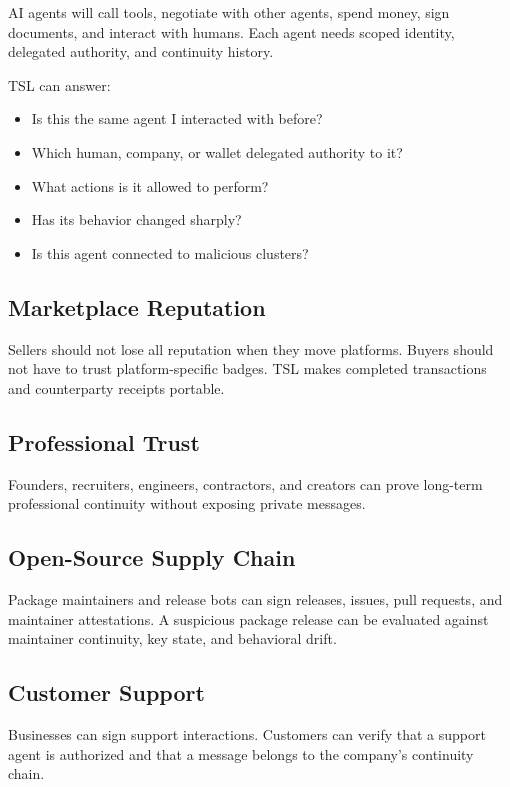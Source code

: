 \documentclass[11pt]{article}
\newcommand{\TSL}{\textsc{TSL}}
\begin{document}
AI agents will call tools, negotiate with other agents, spend money, sign documents, and interact with humans. Each agent needs scoped identity, delegated authority, and continuity history.

\TSL{} can answer:

\begin{itemize}
    \item Is this the same agent I interacted with before?
    \item Which human, company, or wallet delegated authority to it?
    \item What actions is it allowed to perform?
    \item Has its behavior changed sharply?
    \item Is this agent connected to malicious clusters?
\end{itemize}

\subsection{Marketplace Reputation}

Sellers should not lose all reputation when they move platforms. Buyers should not have to trust platform-specific badges. \TSL{} makes completed transactions and counterparty receipts portable.

\subsection{Professional Trust}

Founders, recruiters, engineers, contractors, and creators can prove long-term professional continuity without exposing private messages.

\subsection{Open-Source Supply Chain}

Package maintainers and release bots can sign releases, issues, pull requests, and maintainer attestations. A suspicious package release can be evaluated against maintainer continuity, key state, and behavioral drift.

\subsection{Customer Support}

Businesses can sign support interactions. Customers can verify that a support agent is authorized and that a message belongs to the company's continuity chain.
\end{document}
